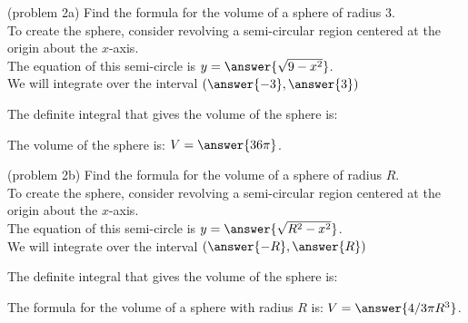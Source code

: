 \documentclass{ximera}
\begin{document}
\begin{problem}(problem 2a)
Find the formula for the volume of a sphere of radius $3$.\\

To create the sphere, consider revolving a semi-circular region centered at the origin about the $x$-axis.\\
The equation of this semi-circle is $y = \answer{\sqrt{9-x^2}}$.\\
We will integrate over the interval $\left(\answer{-3},\answer{3}\right)$

The definite integral that gives the volume of the sphere is:\\
\begin{multipleChoice}
\end{multipleChoice}

The volume of the sphere is: \;  $V = \answer{36 \pi }$.


\end{problem}



\begin{problem}(problem 2b)
Find the formula for the volume of a sphere of radius $R$.\\

To create the sphere, consider revolving a semi-circular region centered at the origin about the $x$-axis.\\
The equation of this semi-circle is $y = \answer{\sqrt{R^2-x^2}}$.\\
We will integrate over the interval $\left(\answer{-R},\answer{R}\right)$

The definite integral that gives the volume of the sphere is:\\
\begin{multipleChoice}
\end{multipleChoice}

The formula for the volume of a sphere with radius $R$ is: \; $V = \answer{4/3 \pi R^3 }$.
\end{problem}
\end{document}
